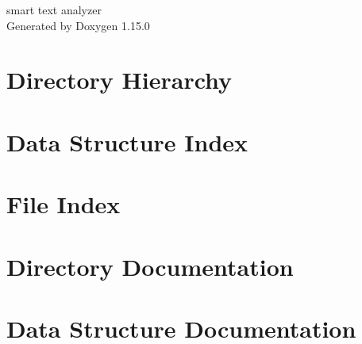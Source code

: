 \documentclass[twoside]{book}
\newcommand{\+}{\discretionary{\mbox{\scriptsize$\hookleftarrow$}}{}{}}
\newcommand{\clearemptydoublepage}{%
    \newpage{\pagestyle{empty}\cleardoublepage}%
  }
\begin{document}
  \raggedbottom
    \hypersetup{pageanchor=false,
                bookmarksnumbered=true,
                pdfencoding=unicode
               }
  \begin{titlepage}
  \vspace*{7cm}
  \begin{center}%
  {\Large smart text analyzer}\\
  \vspace*{1cm}
  {\large Generated by Doxygen 1.15.0}\\
  \end{center}
  \end{titlepage}
  \clearemptydoublepage
  \tableofcontents
  \clearemptydoublepage
  \hypersetup{pageanchor=true}

\chapter{Directory Hierarchy}

\chapter{Data Structure Index}

\chapter{File Index}

\chapter{Directory Documentation}




\chapter{Data Structure Documentation}







\end{document}
